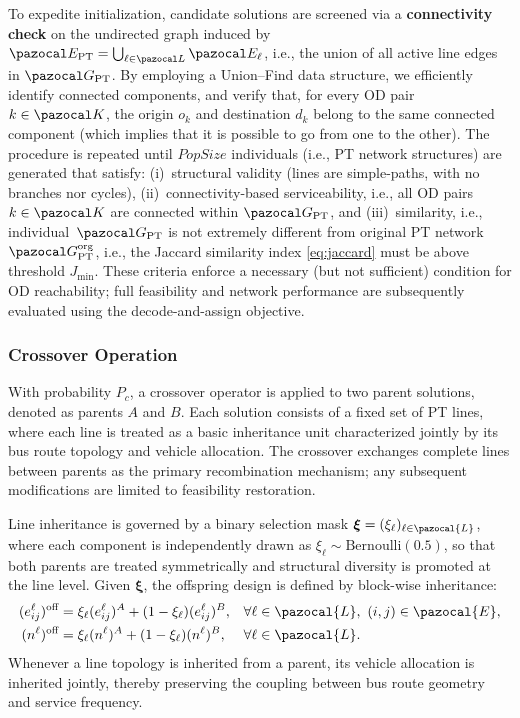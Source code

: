 \documentclass[a4paper,fleqn]{cas-sc}
\begin{document}
To expedite initialization, candidate solutions are screened via a \textbf{connectivity check} on the undirected graph induced by
$\pazocal E_{\text{PT}} = \bigcup_{\ell\in\pazocal L} \pazocal E_\ell$,
i.e., the union of all active line edges in $\pazocal G_{\text{PT}}$.
By employing a Union--Find data structure, we efficiently identify connected components, and verify that, for every OD pair $k\in\pazocal K$, the origin $o_k$ and destination $d_k$
belong to the same connected component (which implies that it is possible to go from one to the other).
%
The procedure is repeated until $\textit{PopSize}$ individuals (i.e., PT network structures) are generated that satisfy:
(i)~structural validity (lines are simple-paths, with no branches nor cycles),
(ii)~connectivity-based serviceability, i.e., all OD pairs $k\in\pazocal K$ are connected within $\pazocal G_{\text{PT}}$,
and (iii)~similarity, i.e., individual~$\pazocal G_\text{PT}$ is not extremely different from original PT network~$\pazocal G_\text{PT}^\text{org}$, i.e., the Jaccard similarity index \eqref{eq:jaccard} must be above threshold $J_{\min}$.
These criteria enforce a necessary (but not sufficient) condition for OD reachability; full feasibility and network performance are subsequently evaluated using the decode-and-assign objective.

\subsubsection{Crossover Operation}\label{sec:crossover}

With probability $P_c$, a crossover operator is applied to two parent solutions, denoted as parents $A$ and $B$.
Each solution consists of a fixed set of PT lines, where each line is treated as a basic inheritance unit characterized jointly by its bus route topology and vehicle allocation.
The crossover exchanges complete lines between parents as the primary recombination mechanism; any subsequent modifications are limited to feasibility restoration.

Line inheritance is governed by a binary selection mask $\boldsymbol{\xi}=(\xi_\ell)_{\ell\in\pazocal{L}}$, where each component is independently drawn as $\xi_\ell \sim \mathrm{Bernoulli}(0.5)$,
so that both parents are treated symmetrically and structural diversity is promoted at the line level.
%
Given $\boldsymbol{\xi}$, the offspring design is defined by block-wise inheritance:
\begin{align}
(e_{ij}^\ell)^{\text{off}}
&=
\xi_\ell (e_{ij}^\ell)^{A} + (1-\xi_\ell)(e_{ij}^\ell)^{B},
&& \forall \ell\in\pazocal{L},\ (i,j)\in\pazocal{E},
\label{eq:crossover_edges}\\
(n^\ell)^{\text{off}}
&=
\xi_\ell (n^\ell)^{A} + (1-\xi_\ell)(n^\ell)^{B},
&& \forall \ell\in\pazocal{L}.
\label{eq:crossover_fleet}
\end{align}
Whenever a line topology is inherited from a parent, its vehicle allocation is inherited jointly, thereby preserving the coupling between bus route geometry and service frequency.
\end{document}
